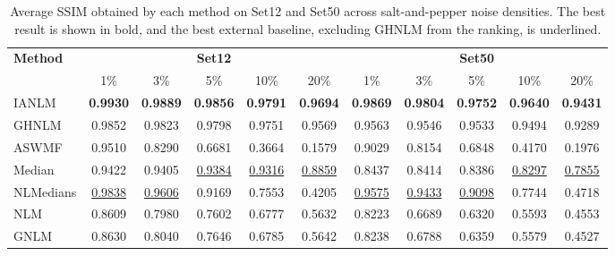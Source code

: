 \documentclass[pdflatex,iicol,sn-mathphys-num]{sn-jnl}
\newcommand{\method}{IANLM\xspace}
\newcommand{\ghnlm}{GHNLM\xspace}
\newcommand{\nlm}{NLM\xspace}
\newcommand{\gnlm}{GNLM\xspace}
\newcommand{\aswmf}{ASWMF\xspace}
\newcommand{\nlmedian}{NLMedians\xspace}
\begin{document}
\begin{table}[!t]
  \centering
  \caption{Average SSIM obtained by each method on Set12 and Set50 across salt-and-pepper noise densities. The best result is shown in bold, and the best external baseline, excluding GHNLM from the ranking, is underlined.}
  \label{tab:ssim_by_density}
  \scriptsize
  \setlength{\tabcolsep}{4pt}
  \renewcommand{\arraystretch}{1.12}
  \begin{tabular*}{\textwidth}{@{\extracolsep{\fill}}lccccc|ccccc}
  \toprule
  \multirow{2}{*}{\textbf{Method}} &
  \multicolumn{5}{c|}{\textbf{Set12}} &
  \multicolumn{5}{c}{\textbf{Set50}} \\
  \cmidrule(lr){2-6}\cmidrule(lr){7-11}
  & 1\% & 3\% & 5\% & 10\% & 20\%
  & 1\% & 3\% & 5\% & 10\% & 20\% \\
  \midrule

  \method
  & \textbf{0.9930}
  & \textbf{0.9889}
  & \textbf{0.9856}
  & \textbf{0.9791}
  & \textbf{0.9694}
  & \textbf{0.9869}
  & \textbf{0.9804}
  & \textbf{0.9752}
  & \textbf{0.9640}
  & \textbf{0.9431} \\

  \ghnlm
  & 0.9852
  & 0.9823
  & 0.9798
  & 0.9751
  & 0.9569
  & 0.9563
  & 0.9546
  & 0.9533
  & 0.9494
  & 0.9289 \\

  \aswmf
  & 0.9510
  & 0.8290
  & 0.6681
  & 0.3664
  & 0.1579
  & 0.9029
  & 0.8154
  & 0.6848
  & 0.4170
  & 0.1976 \\

  Median
  & 0.9422
  & 0.9405
  & \underline{0.9384}
  & \underline{0.9316}
  & \underline{0.8859}
  & 0.8437
  & 0.8414
  & 0.8386
  & \underline{0.8297}
  & \underline{0.7855} \\

  \nlmedian
  & \underline{0.9838}
  & \underline{0.9606}
  & 0.9169
  & 0.7553
  & 0.4205
  & \underline{0.9575}
  & \underline{0.9433}
  & \underline{0.9098}
  & 0.7744
  & 0.4718 \\

  \nlm
  & 0.8609
  & 0.7980
  & 0.7602
  & 0.6777
  & 0.5632
  & 0.8223
  & 0.6689
  & 0.6320
  & 0.5593
  & 0.4553 \\

  \gnlm
  & 0.8630
  & 0.8040
  & 0.7646
  & 0.6785
  & 0.5642
  & 0.8238
  & 0.6788
  & 0.6359
  & 0.5579
  & 0.4527 \\

  \bottomrule
  \end{tabular*}
\end{table}
\end{document}
